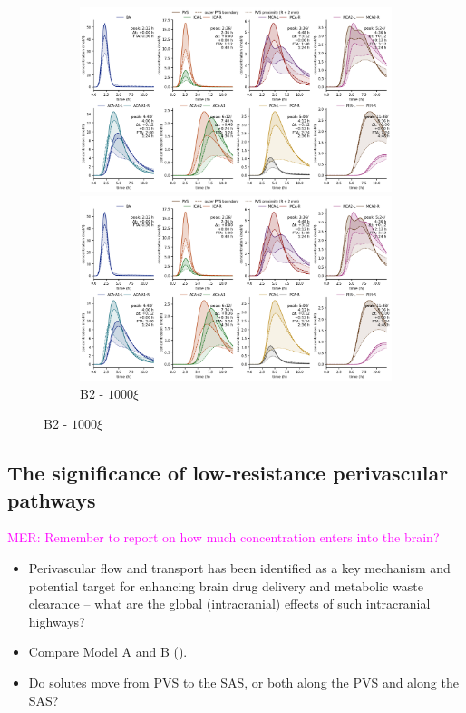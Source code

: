 \documentclass[fleqn,10pt]{wlscirep}
\newcommand{\mer}[1]{\textcolor{magenta}{#1}}
\begin{document}
\begin{figure}
\begin{subfigure}{0.5 \linewidth}
    \caption{B2 - $10 \xi$}
    \includegraphics[width=1\linewidth]{figures/modelB2-100_conc_at_label.png}
    \caption{B2 - $100 \xi$}
    \includegraphics[width=1\linewidth]{figures/modelB2-1000_conc_at_label.png}
    \caption{B2 - $1000 \xi$}
\end{subfigure}
    \label{fig:modelB_xi_variations}
\end{figure}

\subsection*{The significance of low-resistance perivascular pathways}

\mer{MER: Remember to report on how much concentration enters into the brain?}

\begin{itemize}
\item
  Perivascular flow and transport has been identified as a key
  mechanism and potential target for enhancing brain drug delivery and
  metabolic waste clearance -- what are the global (intracranial)
  effects of such intracranial highways? 
\item
  Compare Model A and B ().
\item
  Do solutes move from PVS to the SAS, or both along the PVS and along the SAS?
\end{itemize}
\end{document}
